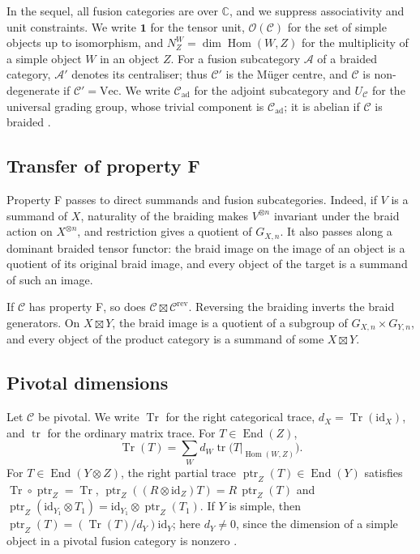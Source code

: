 \documentclass[11pt,oneside]{amsart}
\theoremstyle{remark}
\newcommand{\C}{\mathcal C}
\newcommand{\one}{\mathbf 1}
\newcommand{\Tr}{\operatorname{Tr}}
\newcommand{\tr}{\operatorname{tr}}
\newcommand{\ptr}{\operatorname{ptr}}
\newcommand{\Hom}{\operatorname{Hom}}
\newcommand{\End}{\operatorname{End}}
\newcommand{\id}{\mathrm{id}}
\newcommand{\Vect}{\mathrm{Vec}}
\newcommand{\ad}{\mathrm{ad}}
\newcommand{\rev}{\mathrm{rev}}
\newcommand{\cO}{\mathcal O}
\begin{document}
In the sequel, all fusion categories are over $\mathbb C$, and we suppress associativity and
unit constraints. We write $\one$ for the tensor unit, $\cO(\C)$ for the set of
simple objects up to isomorphism, and $N^W_Z=\dim\Hom(W,Z)$ for the
multiplicity of a simple object $W$ in an object $Z$. For a fusion subcategory
$\mathcal A$ of a braided category, $\mathcal A'$ denotes its centraliser; thus
$\C'$ is the M\"uger centre, and $\C$ is non-degenerate if $\C'=\Vect$. We write
$\C_\ad$ for the adjoint subcategory and $U_\C$ for the universal grading group,
whose trivial component is $\C_\ad$; it is abelian if $\C$ is braided
\cite[Proposition~2.3, Remark~2.7]{DGNO}.

\subsection{Transfer of property F}\label{ssec:transfer}
Property F passes to direct summands and fusion subcategories. Indeed, if $V$ is
a summand of $X$, naturality of the braiding makes $V^{\otimes n}$ invariant
under the braid action on $X^{\otimes n}$, and restriction gives a quotient of
$G_{X,n}$. It also passes along a dominant braided tensor functor: the braid
image on the image of an object is a quotient of its original braid image, and
every object of the target is a summand of such an image.

If $\C$ has property F, so does $\C\boxtimes\C^\rev$. Reversing the braiding
inverts the braid generators. On $X\boxtimes Y$, the braid image is a quotient
of a subgroup of $G_{X,n}\times G_{Y,n}$, and every object of the product
category is a summand of some $X\boxtimes Y$.

\subsection{Pivotal dimensions}\label{ssec:dims}
Let $\C$ be pivotal. We write $\Tr$ for the right categorical trace,
$d_X=\Tr(\id_X)$, and $\tr$ for the ordinary matrix trace. For $T\in\End(Z)$,
\[
\Tr(T)=\sum_Wd_W\tr\bigl(T|_{\Hom(W,Z)}\bigr).
\]
For $T\in\End(Y\otimes Z)$, the right partial trace $\ptr_Z(T)\in\End(Y)$
satisfies $\Tr\circ\ptr_Z=\Tr$, $\ptr_Z((R\otimes\id_Z)T)=R\,\ptr_Z(T)$ and
$\ptr_Z(\id_{Y_1}\otimes T_1)=\id_{Y_1}\otimes\ptr_Z(T_1)$. If $Y$ is simple,
then $\ptr_Z(T)=(\Tr(T)/d_Y)\id_Y$; here $d_Y\ne0$, since the dimension of a
simple object in a pivotal fusion category is nonzero \cite[Proposition~4.8.4]{EGNO}.
\end{document}
